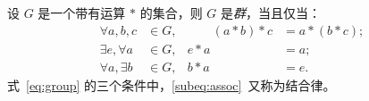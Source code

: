 设 $G$ 是一个带有运算 $*$ 的集合，则 $G$ 是\emph{群}，当且仅当：
\begin{subequations}\label{eq:group}
\begin{alignat}{2}
\forall a,b,c &\in G, &\qquad (a*b)*c &= a*(b*c);\label{subeq:assoc}\\
\exists e, \forall a &\in G, &  e*a &= a; \\
\forall a, \exists b &\in G, &  b*a &= e.
\end{alignat}
\end{subequations}
式~\eqref{eq:group} 的三个条件中，\eqref{subeq:assoc}~又称为结合律。
